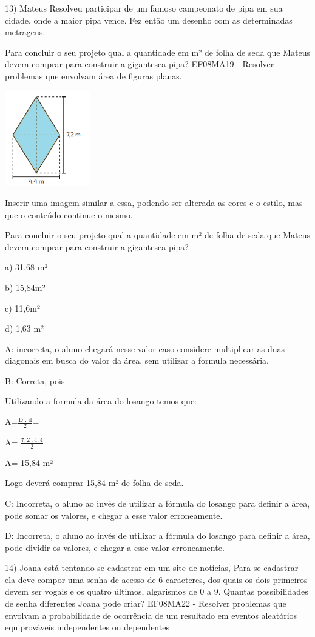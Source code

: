 13) Mateus Resolveu participar de um famoso campeonato de pipa em sua
cidade, onde a maior pipa vence. Fez então um desenho com as
determinadas metragens.

Para concluir o seu projeto qual a quantidade em m² de folha de seda que
Mateus devera comprar para construir a gigantesca pipa? EF08MA19 -
Resolver problemas que envolvam área de figuras planas.

\includegraphics[width=1.45833in,height=1.63333in]{./imgSAEB_8_MAT/media/image59.png}

Inserir uma imagem similar a essa, podendo ser alterada as cores e o
estilo, mas que o conteúdo continue o mesmo.

Para concluir o seu projeto qual a quantidade em m² de folha de seda que
Mateus devera comprar para construir a gigantesca pipa?

a) 31,68 m²

b) 15,84m²

c) 11,6m²

d) 1,63 m²

A: incorreta, o aluno chegará nesse valor caso considere multiplicar as
duas diagonais em busca do valor da área, sem utilizar a formula
necessária.

B: Correta, pois

Utilizando a formula da área do losango temos que:

A=\(\frac{\text{D\ .\ d}}{2}\)=

A= \(\frac{7,2\ .\ 4,4}{2}\)

A= 15,84 m²

Logo deverá comprar 15,84 m² de folha de seda.

C: Incorreta, o aluno ao invés de utilizar a fórmula do losango para
definir a área, pode somar os valores, e chegar a esse valor
erroneamente.

D: Incorreta, o aluno ao invés de utilizar a fórmula do losango para
definir a área, pode dividir os valores, e chegar a esse valor
erroneamente.

14) Joana está tentando se cadastrar em um site de notícias, Para se
cadastrar ela deve compor uma senha de acesso de 6 caracteres, dos quais
os dois primeiros devem ser vogais e os quatro últimos, algarismos de 0
a 9. Quantas possibilidades de senha diferentes Joana pode criar?
EF08MA22 - Resolver problemas que envolvam a probabilidade de ocorrência
de um resultado em eventos aleatórios equiprováveis independentes ou
dependentes

